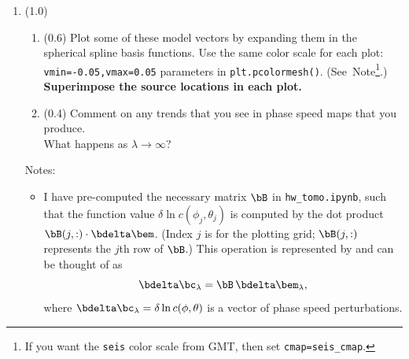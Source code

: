 \documentclass[11pt,titlepage,fleqn]{article}
\newcommand{\tfiletomo}{{\tt hw\_tomo.ipynb}}
\begin{document}
\begin{enumerate}
\begin{enumerate}
\verb+lamvec = 10**np.linspace(np.log10(minlam),np.log10(maxlam),num=numlam)+

with $\lambda_{\rm min} = 0.01$ and $\lambda_{\rm max} = 1000$ (specify a value for \verb+numlam+).


\item (0.5) Plot the misfit norm ($y$-axis) versus model norm ($x$-axis) using log-scaled values.


I recommend transforming the quantities by $\log_{10}$, then using the \verb+plot+ command, rather than dealing with the \verb+plt.loglog()+ command.

\end{enumerate}


\pagebreak
\item (1.0) 

\begin{enumerate}
\item (0.6) Plot some of these model vectors by expanding them in the spherical spline basis functions. Use the same color scale for each plot: \verb+vmin=-0.05,vmax=0.05+ parameters in \verb+plt.pcolormesh()+. (See~Note\footnote{If you want the {\tt seis} color scale from GMT, then set {\tt cmap=seis\_cmap}.}.) {\bf Superimpose the source locations in each plot.}

\item (0.4) Comment on any trends that you see in phase speed maps that you produce. \\
What happens as $\lambda \rightarrow \infty$?
\end{enumerate}

Notes:
%
\begin{itemize}
\item I have pre-computed the necessary matrix $\bB$ in \tfiletomo, such that the function value $\delta\ln c(\phi_j, \theta_j)$ is computed by the dot product $\bB(j,:) \cdot \bdelta\bem$. (Index $j$ is for the plotting grid; $\bB(j,:)$ represents the $j$th row of $\bB$.) This operation is represented by  and can be thought of as
%
\begin{equation}
\bdelta\bc_{\lambda} = \bB\,\bdelta\bem_{\lambda},
\label{Bexpand}
\end{equation}
%
where $\bdelta\bc_{\lambda} = \delta\ln c(\phi, \theta)$ is a vector of phase speed perturbations.


\end{itemize}
\end{enumerate}
\end{document}
